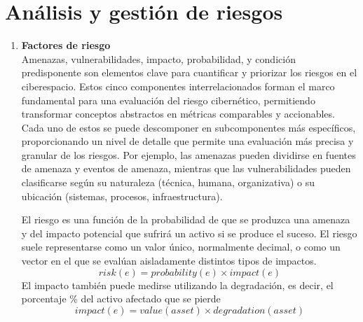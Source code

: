 \section{Análisis y gestión de riesgos}
\begin{enumerate}[resume]

\item \textbf{Factores de riesgo} \\
Amenazas, vulnerabilidades, impacto, probabilidad, y condición predisponente son elementos clave para cuantificar y priorizar los riesgos en el ciberespacio. 
Estos cinco componentes interrelacionados forman el marco fundamental para una evaluación del riesgo cibernético, permitiendo transformar conceptos abstractos en métricas comparables y accionables. 
Cada uno de estos se puede descomponer en subcomponentes más específicos, proporcionando un nivel de detalle que permite una evaluación más precisa y granular de los riesgos. Por ejemplo, las amenazas pueden dividirse en fuentes de amenaza y eventos de amenaza, mientras que las vulnerabilidades pueden clasificarse según su naturaleza (técnica, humana, organizativa) o su ubicación (sistemas, procesos, infraestructura).

El riesgo es una función de la probabilidad de que se produzca una amenaza y del impacto potencial que sufrirá un activo si se produce el suceso.
El riesgo suele representarse como un valor único, normalmente decimal, o como un vector en el que se evalúan aisladamente distintos tipos de impactos.
\[
risk(e) = probability(e) \times impact(e)
\]
El impacto también puede medirse utilizando la degradación, es decir, el porcentaje \% del activo afectado que se pierde
\[
   impact(e) = value(asset) \times degradation(asset)
\]



\end{enumerate}
